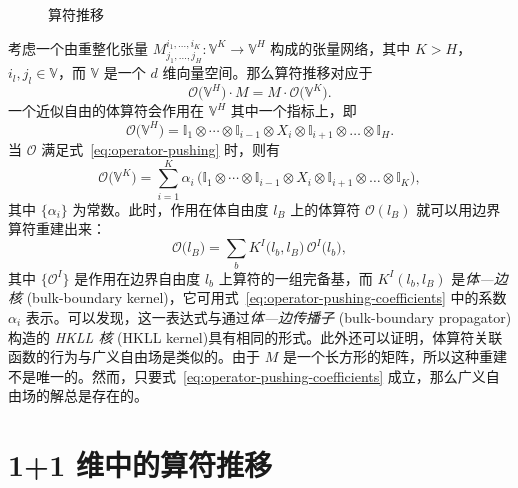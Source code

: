 \begin{figure}[htb]
  \centering
  \caption{算符推移}
  \label{fig:operator-pushing}
\end{figure}

考虑一个由重整化张量 $M^{i_1,\dots,i_K}_{j_1,\dots,j_H}\colon\mathbb{V}^K\to\mathbb{V}^H$ 构成的张量网络，其中 $K>H$，$i_l,j_l\in\mathbb{V}$，而 $\mathbb{V}$ 是一个 $d$ 维向量空间。那么算符推移对应于
\begin{equation}
  \mathcal{O} \bigl( \mathbb{V}^H \bigr) \cdot M = M \cdot \mathcal{O} \bigl( \mathbb{V}^K \bigr).
  \label{eq:operator-pushing}
\end{equation}
一个近似自由的体算符会作用在 $\mathbb{V}^H$ 其中一个指标上，即
\begin{equation}
    \mathcal{O} \bigl( \mathbb{V}^H \bigr)
  = \mathbb{I}_1 \otimes \cdots \otimes \mathbb{I}_{i-1} \otimes X_i \otimes \mathbb{I}_{i+1} \otimes \dots \otimes \mathbb{I}_{H}.
\end{equation}
当 $\mathcal{O}$ 满足式~\eqref{eq:operator-pushing} 时，则有
\begin{equation}
    \mathcal{O} \bigl( \mathbb{V}^K \bigr)
  = \sum_{i=1}^K \alpha_i \, \bigl(
      \mathbb{I}_1 \otimes \cdots \otimes \mathbb{I}_{i-1} \otimes X_i \otimes \mathbb{I}_{i+1} \otimes \dots \otimes \mathbb{I}_{K}
    \bigr),
  \label{eq:operator-pushing-coefficients}
\end{equation}
其中 $\{\alpha_i\}$ 为常数。此时，作用在体自由度 $l_B$ 上的体算符 $\mathcal{O}(l_B)$ 就可以用边界算符重建出来：
\begin{equation}
  \mathcal{O} \bigl( l_B \bigr) = \sum_b K^I \bigl( l_b, l_B \bigr) \, \mathcal{O}^I \bigl( l_b \bigr),
\end{equation}
其中 $\{\mathcal{O}^I\}$ 是作用在边界自由度 $l_b$ 上算符的一组完备基，而 $K^I(l_b, l_B)$ 是\emph{体—边核} (bulk-boundary kernel)，它可用式~\eqref{eq:operator-pushing-coefficients} 中的系数 $\alpha_i$ 表示。可以发现，这一表达式与通过\emph{体—边传播子} (bulk-boundary propagator) 构造的 \emph{HKLL 核} (HKLL kernel)\cite{hamilton2006local,hamilton2006holographic}具有相同的形式。此外还可以证明，体算符关联函数的行为与广义自由场是类似的\cite{bhattacharyya2018tensor,hung2019padic}。由于 $M$ 是一个长方形的矩阵，所以这种重建不是唯一的。然而，只要式~\eqref{eq:operator-pushing-coefficients} 成立，那么广义自由场的解总是存在的。

\section{1+1 维中的算符推移}


